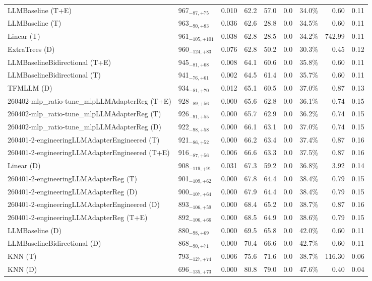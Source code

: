 \begin{tabular}{llcccccrr}
LLMBaseline (T+E) & 967${}_{-87,+75}$ & 0.010 & 62.2 & 57.0 & 0.0 & 34.0\% & 0.60 & 0.11 \\
LLMBaseline (T) & 963${}_{-90,+83}$ & 0.036 & 62.6 & 28.8 & 0.0 & 34.5\% & 0.60 & 0.11 \\
Linear (T) & 961${}_{-105,+101}$ & 0.038 & 62.8 & 28.5 & 0.0 & 34.2\% & 742.99 & 0.11 \\
ExtraTrees (D) & 960${}_{-124,+83}$ & 0.076 & 62.8 & 50.2 & 0.0 & 30.3\% & 0.45 & 0.12 \\
LLMBaselineBidirectional (T+E) & 945${}_{-81,+68}$ & 0.008 & 64.1 & 60.6 & 0.0 & 35.8\% & 0.60 & 0.11 \\
LLMBaselineBidirectional (T) & 941${}_{-76,+61}$ & 0.002 & 64.5 & 61.4 & 0.0 & 35.7\% & 0.60 & 0.11 \\
TFMLLM (D) & 934${}_{-81,+70}$ & 0.012 & 65.1 & 60.5 & 0.0 & 37.0\% & 0.87 & 0.13 \\
260402-mlp_ratio-tune_mlpLLMAdapterReg (T+E) & 928${}_{-89,+56}$ & 0.000 & 65.6 & 62.8 & 0.0 & 36.1\% & 0.74 & 0.15 \\
260402-mlp_ratio-tune_mlpLLMAdapterReg (T) & 926${}_{-91,+55}$ & 0.000 & 65.7 & 62.9 & 0.0 & 36.2\% & 0.74 & 0.15 \\
260402-mlp_ratio-tune_mlpLLMAdapterReg (D) & 922${}_{-98,+58}$ & 0.000 & 66.1 & 63.1 & 0.0 & 37.0\% & 0.74 & 0.15 \\
260401-2-engineeringLLMAdapterEngineered (T) & 921${}_{-86,+52}$ & 0.000 & 66.2 & 63.4 & 0.0 & 37.4\% & 0.87 & 0.16 \\
260401-2-engineeringLLMAdapterEngineered (T+E) & 916${}_{-87,+56}$ & 0.006 & 66.6 & 63.3 & 0.0 & 37.5\% & 0.87 & 0.16 \\
Linear (D) & 908${}_{-119,+91}$ & 0.031 & 67.3 & 59.2 & 0.0 & 36.8\% & 3.92 & 0.14 \\
260401-2-engineeringLLMAdapterReg (T) & 901${}_{-109,+62}$ & 0.000 & 67.8 & 64.4 & 0.0 & 38.4\% & 0.79 & 0.15 \\
260401-2-engineeringLLMAdapterReg (D) & 900${}_{-107,+64}$ & 0.000 & 67.9 & 64.4 & 0.0 & 38.4\% & 0.79 & 0.15 \\
260401-2-engineeringLLMAdapterEngineered (D) & 893${}_{-106,+59}$ & 0.000 & 68.4 & 65.2 & 0.0 & 38.7\% & 0.87 & 0.16 \\
260401-2-engineeringLLMAdapterReg (T+E) & 892${}_{-106,+66}$ & 0.000 & 68.5 & 64.9 & 0.0 & 38.6\% & 0.79 & 0.15 \\
LLMBaseline (D) & 880${}_{-98,+69}$ & 0.000 & 69.5 & 65.8 & 0.0 & 42.0\% & 0.60 & 0.11 \\
LLMBaselineBidirectional (D) & 868${}_{-90,+71}$ & 0.000 & 70.4 & 66.6 & 0.0 & 42.7\% & 0.60 & 0.11 \\
KNN (T) & 793${}_{-127,+74}$ & 0.006 & 75.6 & 71.6 & 0.0 & 38.7\% & 116.30 & 0.06 \\
KNN (D) & 696${}_{-135,+73}$ & 0.000 & 80.8 & 79.0 & 0.0 & 47.6\% & 0.40 & 0.04 \\
\bottomrule
\end{tabular}